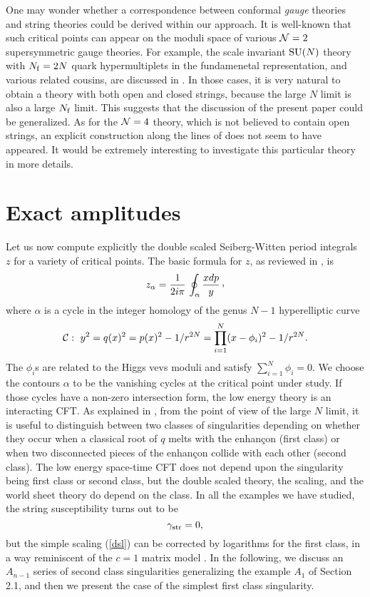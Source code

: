\documentclass[a4paper,12pt]{article}
\def\cvp{\raise 2pt\hbox{,}}
\begin{document}
{One may wonder whether a correspondence between conformal {\it gauge} 
theories and string theories could be derived within our approach. It is 
well-known that such critical points can appear on the moduli space of 
various ${\cal N}=2$ supersymmetric gauge theories. For example, the scale
invariant ${\rm SU}(N)$ theory with 
$N_{\rm f}=2N$ quark hypermultiplets in the fundamenetal representation, 
and various related cousins, are discussed in \cite{arg}. In those cases, 
it is very natural to obtain a theory with both open and closed strings, 
because the large $N$ limit is also a large $N_{\rm f}$ limit. This 
suggests that the discussion of the present paper could be generalized.
As for the ${\cal N}=4$ theory, which is not believed to 
contain open strings, an explicit construction along the lines of 
\cite{arg} does not seem to have appeared. It would be extremely 
interesting to investigate this particular theory in more details.
%
\section{Exact amplitudes}
%
Let us now compute explicitly the double scaled Seiberg-Witten period 
integrals $z$ for a variety of critical points. The basic formula for $z$, 
as reviewed in \cite{fer}, is \cite{SW,sun}
%
\begin{equation}
\label{zdef}
z_{\alpha} = {1\over 2i\pi}\, \oint_{\alpha} {x dp\over y}\, \cvp
\end{equation}
%
where $\alpha$ is a cycle in the integer homology of the genus $N-1$
hyperelliptic curve
%
\begin{equation}
\label{curve}
{\cal C}:\ y^{2} = q(x)^{2}= 
p(x)^{2} - 1/r^{2N} = \prod_{i=1}^{N}(x-\phi_{i})^{2} - 1/r^{2N}.
\end{equation}
%
The $\phi_{i}$s are related to the Higgs vevs moduli and satisfy 
$\sum_{i=1}^{N}\phi_{i}=0$. We choose the contours $\alpha$ to be the 
vanishing cycles at the critical point under study. If those cycles have 
a non-zero intersection form, the low energy theory is an interacting CFT.
As explained in \cite{fer}, 
from the point of view of the large $N$ limit, it is useful to distinguish 
between two classes of singularities depending on whether they occur when a 
classical root of $q$ melts with the enhan\c con (first class)
or when two disconnected pieces of the enhan\c con collide with each other 
(second class). The low energy space-time
CFT does not depend upon the singularity 
being first class or second class, but the double scaled theory, the 
scaling, and the world sheet theory
do depend on the class. In all the examples we have studied, the 
string susceptibility turns out to be
%
\begin{equation}
\label{gammastr}
\gamma_{\rm str} =0,
\end{equation}
%
but the simple scaling (\ref{dsl}) can be corrected by logarithms for the 
first class, in a way reminiscent of the $c=1$ matrix model 
\cite{c1}. In the following, we discuss an $A_{n-1}$ series of second 
class singularities generalizing the example $A_{1}$ of Section 2.1,
and then we present the case of the simplest first class singularity.
%
}
\end{document}
